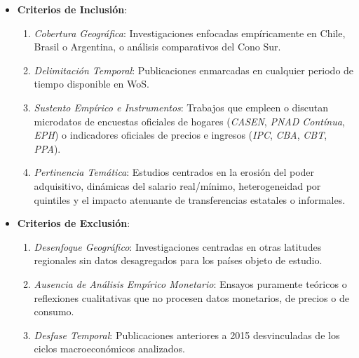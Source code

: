 \begin{itemize}
    \item \textbf{Criterios de Inclusión}:
    \begin{enumerate}
        \item \textit{Cobertura Geográfica}: Investigaciones enfocadas empíricamente en Chile, Brasil o Argentina, o análisis comparativos del Cono Sur.
        \item \textit{Delimitación Temporal}: Publicaciones enmarcadas en cualquier periodo de tiempo disponible en WoS.
        \item \textit{Sustento Empírico e Instrumentos}: Trabajos que empleen o discutan microdatos de encuestas oficiales de hogares (\textit{CASEN}, \textit{PNAD Contínua}, \textit{EPH}) o indicadores oficiales de precios e ingresos (\textit{IPC}, \textit{CBA}, \textit{CBT}, \textit{PPA}).
        \item \textit{Pertinencia Temática}: Estudios centrados en la erosión del poder adquisitivo, dinámicas del salario real/mínimo, heterogeneidad por quintiles y el impacto atenuante de transferencias estatales o informales.
    \end{enumerate}

    \item \textbf{Criterios de Exclusión}:
    \begin{enumerate}
        \item \textit{Desenfoque Geográfico}: Investigaciones centradas en otras latitudes regionales sin datos desagregados para los países objeto de estudio.
        \item \textit{Ausencia de Análisis Empírico Monetario}: Ensayos puramente teóricos o reflexiones cualitativas que no procesen datos monetarios, de precios o de consumo.
        \item \textit{Desfase Temporal}: Publicaciones anteriores a 2015 desvinculadas de los ciclos macroeconómicos analizados.
    \end{enumerate}
\end{itemize}

